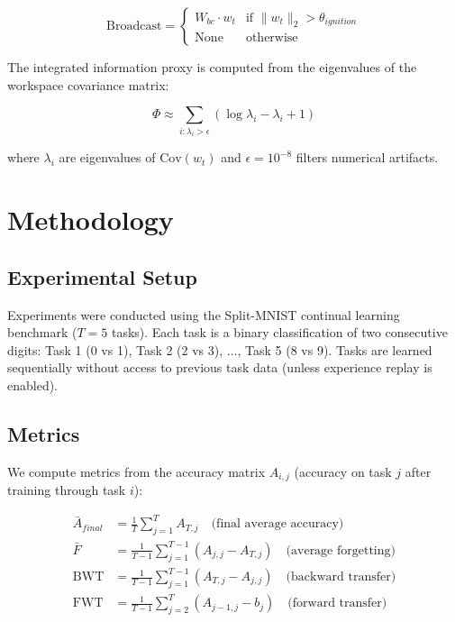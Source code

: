\documentclass[11pt]{article}
\begin{document}
\begin{equation}
\text{Broadcast} = \begin{cases}
W_{bc} \cdot w_t & \text{if } \|w_t\|_2 > \theta_{ignition} \\
\text{None} & \text{otherwise}
\end{cases}
\end{equation}

The integrated information proxy is computed from the eigenvalues of the workspace covariance matrix:

\begin{equation}
\Phi \approx \sum_{i: \lambda_i > \epsilon} (\log \lambda_i - \lambda_i + 1)
\end{equation}

where $\lambda_i$ are eigenvalues of $\text{Cov}(w_t)$ and $\epsilon = 10^{-8}$ filters numerical artifacts.

\section{Methodology}

\subsection{Experimental Setup}

Experiments were conducted using the Split-MNIST continual learning benchmark ($T=5$ tasks). Each task is a binary classification of two consecutive digits: Task 1 (0 vs 1), Task 2 (2 vs 3), ..., Task 5 (8 vs 9). Tasks are learned sequentially without access to previous task data (unless experience replay is enabled).

\subsection{Metrics}

We compute metrics from the accuracy matrix $A_{i,j}$ (accuracy on task $j$ after training through task $i$):

\begin{align}
\bar{A}_{final} &= \frac{1}{T} \sum_{j=1}^T A_{T,j} \quad \text{(final average accuracy)} \\
\bar{F} &= \frac{1}{T-1} \sum_{j=1}^{T-1} (A_{j,j} - A_{T,j}) \quad \text{(average forgetting)} \\
\text{BWT} &= \frac{1}{T-1} \sum_{j=1}^{T-1} (A_{T,j} - A_{j,j}) \quad \text{(backward transfer)} \\
\text{FWT} &= \frac{1}{T-1} \sum_{j=2}^{T} (A_{j-1,j} - b_j) \quad \text{(forward transfer)}
\end{align}
\end{document}
